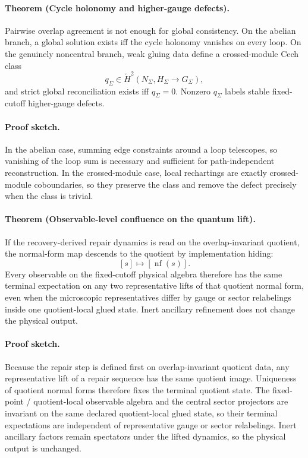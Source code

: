 \paragraph{Theorem (Cycle holonomy and higher-gauge defects).}
Pairwise overlap agreement is not enough for global consistency. On the abelian branch, a global
solution exists iff the cycle holonomy vanishes on every loop. On the genuinely noncentral
branch, weak gluing data define a crossed-module Cech class
\[
q_\Sigma \in \check H^2(N_\Sigma,H_\Sigma \to G_\Sigma),
\]
and strict global reconciliation exists iff \(q_\Sigma=0\). Nonzero \(q_\Sigma\) labels stable
fixed-cutoff higher-gauge defects.

\paragraph{Proof sketch.}
In the abelian case, summing edge constraints around a loop telescopes, so vanishing of the loop
sum is necessary and sufficient for path-independent reconstruction. In the crossed-module case,
local rechartings are exactly crossed-module coboundaries, so they preserve the class and remove
the defect precisely when the class is trivial.

\paragraph{Theorem (Observable-level confluence on the quantum lift).}
If the recovery-derived repair dynamics is read on the overlap-invariant quotient, the normal-form map descends to the quotient by
implementation hiding:
\[
[s]\mapsto [\operatorname{nf}(s)].
\]
Every observable on the fixed-cutoff physical algebra therefore has the same terminal expectation
on any two representative lifts of that quotient normal form, even when the microscopic
representatives differ by gauge or sector relabelings inside one quotient-local glued state.
Inert ancillary refinement does not change the physical output.

\paragraph{Proof sketch.}
Because the repair step is defined first on overlap-invariant quotient data, any representative
lift of a repair sequence has the same quotient image. Uniqueness of quotient normal forms
therefore fixes the terminal quotient state. The fixed-point / quotient-local
observable algebra and the central sector projectors are invariant on the same declared
quotient-local glued state, so their terminal expectations are independent of representative gauge
or sector relabelings. Inert
ancillary factors remain spectators under the lifted dynamics, so the physical output is
unchanged.


